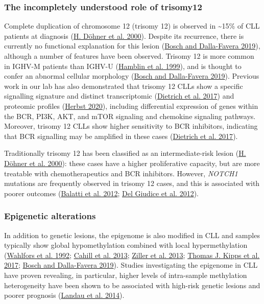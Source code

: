 \documentclass[11pt, a4paper, twosided]{book}
\begin{document}
\hypertarget{intro-trisomy12}{%
\subsubsection{The incompletely understood role of trisomy12}\label{intro-trisomy12}}

Complete duplication of chromosome 12 (trisomy 12) is observed in \textasciitilde15\% of CLL patients at diagnosis (\protect\hyperlink{ref-Dohner2000}{H. Döhner et al. 2000}). Despite its recurrence, there is currently no functional explanation for this lesion (\protect\hyperlink{ref-Bosch2019}{Bosch and Dalla-Favera 2019}), although a number of features have been observed. Trisomy 12 is more common in IGHV-M patients than IGHV-U (\protect\hyperlink{ref-Hamblin1999}{Hamblin et al. 1999}), and is thought to confer an abnormal cellular morphology (\protect\hyperlink{ref-Bosch2019}{Bosch and Dalla-Favera 2019}). Previous work in our lab has also demonstrated that trisomy 12 CLLs show a specific signalling signature and distinct transcriptomic (\protect\hyperlink{ref-JCIpaper}{Dietrich et al. 2017}) and proteomic profiles (\protect\hyperlink{ref-HerbstThesis}{Herbst 2020}), including differential expression of genes within the BCR, PI3K, AKT, and mTOR signaling and chemokine signaling pathways. Moreover, trisomy 12 CLLs show higher sensitivity to BCR inhibitors, indicating that BCR signalling may be amplified in these cases (\protect\hyperlink{ref-JCIpaper}{Dietrich et al. 2017}).

Traditionally trisomy 12 has been classified as an intermediate-risk lesion (\protect\hyperlink{ref-Dohner2000}{H. Döhner et al. 2000}): these cases have a higher proliferative capacity, but are more treatable with chemotherapeutics and BCR inhibitors. However, \emph{NOTCH1} mutations are frequently observed in trisomy 12 cases, and this is associated with poorer outcomes (\protect\hyperlink{ref-Balatti2012}{Balatti et al. 2012}; \protect\hyperlink{ref-Giudice2012}{Del Giudice et al. 2012}).

\hypertarget{intro-epigenetic-alterations}{%
\subsubsection{Epigenetic alterations}\label{intro-epigenetic-alterations}}

In addition to genetic lesions, the epigenome is also modified in CLL and samples typically show global hypomethylation combined with local hypermethylation (\protect\hyperlink{ref-Wahlfors1992}{Wahlfors et al. 1992}; \protect\hyperlink{ref-Cahill2013}{Cahill et al. 2013}; \protect\hyperlink{ref-Ziller2013}{Ziller et al. 2013}; \protect\hyperlink{ref-Kipps2017}{Thomas J. Kipps et al. 2017}; \protect\hyperlink{ref-Bosch2019}{Bosch and Dalla-Favera 2019}). Studies investigating the epigenome in CLL have proven revealing, in particular, higher levels of intra-sample methylation heterogeneity have been shown to be associated with high-risk genetic lesions and poorer prognosis (\protect\hyperlink{ref-Landau2014}{Landau et al. 2014}).
\end{document}
